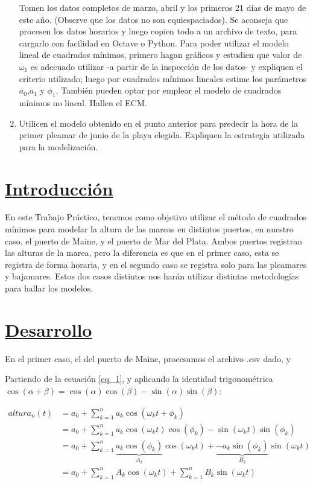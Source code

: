 \documentclass[10pt,a4paper]{article}
\numberwithin{equation}{section}
\numberwithin{figure}{section}
\numberwithin{table}{section}
\begin{document}
\begin{enumerate}
    Tomen los datos completos de marzo, abril y los primeros 21 días de mayo de este año. (Observe que los datos no son equiespaciados). Se aconseja que procesen los datos horarios y luego copien todo a un archivo de texto, para cargarlo con facilidad en Octave o Python.
    Para poder utilizar el modelo lineal de cuadrados mínimos, primero hagan gráficos y estudien que valor de $\omega_1$ es adecuado utilizar -a partir de la inspección de los datos- y expliquen el criterio utilizado; luego por cuadrados mínimos lineales estime los parámetros $a_0$,$a_1$ y $\phi_1$.
    También pueden optar por emplear el modelo de cuadrados mínimos no lineal.
    Hallen el ECM.\\
    
    \item
    Utilicen el modelo obtenido en el punto anterior para predecir la hora de la primer pleamar de junio de la playa elegida. Expliquen la estrategia utilizada para la modelización.
    
\end{enumerate}


\section{\underline{Introducción}}

En este Trabajo Práctico, tenemos como objetivo utilizar el método de cuadrados mínimos para modelar la altura de las mareas en distintos puertos, en nuestro caso, el puerto de Maine, y el puerto de Mar del Plata.
Ambos puertos registran las alturas de la marea, pero la diferencia es que en el primer caso, esta se registra de forma horaria, y en el segundo caso se registra solo para las pleamares y bajamares.
Estos dos casos distintos nos harán utilizar distintas metodologías para hallar los modelos.

\section{\underline{Desarrollo}}

En el primer caso, el del puerto de Maine, procesamos el archivo .csv dado, y 

Partiendo de la ecuación \ref*{eq_1}, y aplicando la identidad trigonométrica $ \cos(\alpha+\beta) = \cos(\alpha)\cos(\beta) - \sin(\alpha)\sin(\beta) $:

\begin{equation}\label{eqn:eq_3}
    \begin{split}
        altura_n(t) &= a_0 + \sum_{k=1}^{n} a_k \cos(\omega_k t + \phi_k) \\
                  &= a_0 + \sum_{k=1}^{n} a_k  \cos(\omega_k t)\cos(\phi_k) -  \sin(\omega_k t)\sin(\phi_k)  \\
                  &= a_0 + \sum_{k=1}^{n} \underbrace{a_k \cos(\phi_k)}_{A_k} \cos(\omega_k t) + \underbrace{ - a_k \sin(\phi_k)}_{B_k} \sin(\omega_k t) \\
                  &= a_0 + \sum_{k=1}^{n} A_k \cos(\omega_k t)  + \sum_{k=1}^{n} B_k \sin(\omega_k t)
    \end{split}    
\end{equation}
\end{document}
